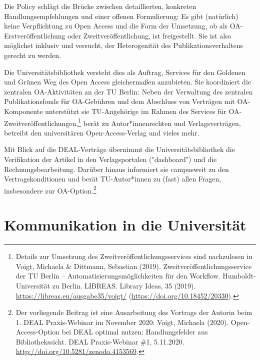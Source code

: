 \documentclass[a4paper,
fontsize=11pt,
oneside,
numbers=noperiodatend,
parskip=half-,
bibliography=totoc,
final
]{scrartcl}
\begin{document}
Die Policy schlägt die Brücke zwischen detaillierten, konkreten
Handlungsempfehlungen und einer offenen Formulierung: Es gibt
(natürlich) keine Verpflichtung zu Open Access und die Form der
Umsetzung, ob als OA-Erstveröffentlichung oder Zweitveröffentlichung,
ist freigestellt. Sie ist also möglichst inklusiv und versucht, der
Heterogenität des Publikationsverhaltens gerecht zu werden.

Die Universitätsbibliothek versteht dies als Auftrag, Services für den
Goldenen und Grünen Weg des Open Access gleichermaßen anzubieten. Sie
koordiniert die zentralen OA-Aktivitäten an der TU Berlin: Neben der
Verwaltung des zentralen Publikationsfonds für OA-Gebühren und dem
Abschluss von Verträgen mit OA-Komponente unterstützt sie TU-Angehörige
im Rahmen des Services für OA-Zweitveröffentlichungen,\footnote{Details
  zur Umsetzung des Zweitveröffentlichungsservices sind nachzulesen in
  Voigt, Michaela \& Dittmann, Sebastian (2019).
  Zweitveröffentlichungsservice der TU Berlin --
  Automatisierungsmöglichkeiten für den Workflow. Humboldt-Universität
  zu Berlin. LIBREAS. Library Ideas, 35 (2019).
  \url{https://libreas.eu/ausgabe35/voigt/}
  (\url{https://doi.org/10.18452/20330}).} berät zu Autor*innenrechten
und Verlagsverträgen, betreibt den universitären Open-Access-Verlag und
vieles mehr.

Mit Blick auf die DEAL-Verträge übernimmt die Universitätsbibliothek die
Verifikation der Artikel in den Verlagsportalen ("dashboard") und die
Rechnungsbearbeitung. Darüber hinaus informiert sie campusweit zu den
Vertragskonditionen und berät TU-Autor*innen zu (fast) allen Fragen,
insbesondere zur OA-Option.\footnote{Der vorliegende Beitrag ist eine
  Ausarbeitung des Vortrags der Autorin beim 1. DEAL Praxis-Webinar im
  November 2020: Voigt, Michaela (2020). Open-Access-Option bei DEAL
  optimal nutzen: Handlungsfelder aus Bibliothekssicht. DEAL
  Praxis-Webinar \#1, 5.11.2020.
  \url{http://doi.org/10.5281/zenodo.4153569}.}

\hypertarget{kommunikation-in-die-universituxe4t}{%
\section{Kommunikation in die
Universität}\label{kommunikation-in-die-universituxe4t}}
\end{document}
